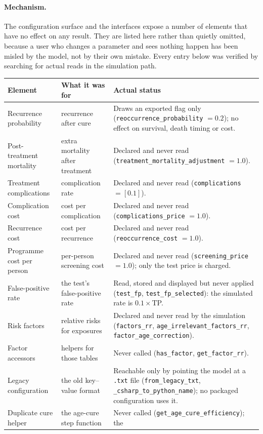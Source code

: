 \documentclass[12pt,a4paper]{article}
\newcommand{\id}[1]{\texttt{#1}}
\newcommand{\mech}[1]{\paragraph{Mechanism.} #1}
\begin{document}
\mech{The configuration surface and the interfaces expose a number of elements that have no effect on any
result. They are listed here rather than quietly omitted, because a user who changes a parameter and sees
nothing happen has been misled by the model, not by their own mistake. Every entry below was verified by
searching for actual reads in the simulation path.

\begin{center}
\footnotesize\setlength{\tabcolsep}{3pt}
\begin{tabular}{@{}p{4.3cm}p{3.8cm}p{7.2cm}@{}}
\toprule
\textbf{Element} & \textbf{What it was for} & \textbf{Actual status} \\
\midrule
Recurrence probability & recurrence after cure & Draws an exported flag only
(\id{reoccurrence\_probability} $=0.2$); no effect on survival, death timing or cost. \\
Post-treatment mortality & extra mortality after treatment & Declared and never read
(\id{treatment\_mortality\_adjustment} $=1.0$). \\
Treatment complications & complication rate & Declared and never read
(\id{complications} $=[0.1]$). \\
Complication cost & cost per complication & Declared and never read
(\id{complications\_price} $=1.0$). \\
Recurrence cost & cost per recurrence & Declared and never read (\id{reoccurrence\_cost} $=1.0$). \\
Programme cost per person & per-person screening cost & Declared and never read
(\id{screening\_price} $=1.0$); only the test price is charged. \\
False-positive rate & the test's false-positive rate & Read, stored and displayed but never applied
(\id{test\_fp}, \id{test\_fp\_selected}): the simulated rate is $0.1\times$TP. \\
Risk factors & relative risks for exposures & Declared and never read by the simulation
(\id{factors\_rr}, \id{age\_irrelevant\_factors\_rr}, \id{factor\_age\_correction}). \\
Factor accessors & helpers for those tables & Never called (\id{has\_factor}, \id{get\_factor\_rr}). \\
Legacy configuration & the old key--value format & Reachable only by pointing the model at a \id{.txt}
file (\id{from\_legacy\_txt}, \id{\_csharp\_to\_python\_name}); no packaged configuration uses it. \\
Duplicate cure helper & the age-cure step function & Never called (\id{get\_age\_cure\_efficiency}); the

\end{tabular}
\end{center}}
\end{document}

